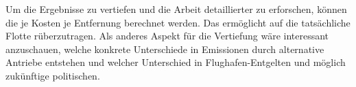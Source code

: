 

Um die Ergebnisse zu vertiefen und die Arbeit detaillierter zu erforschen, können die je Kosten je Entfernung berechnet werden.
Das ermöglicht auf die tatsächliche Flotte rüberzutragen.
Als anderes Aspekt für die Vertiefung wäre interessant anzuschauen, welche konkrete Unterschiede in Emissionen durch alternative Antriebe entstehen
und welcher Unterschied in Flughafen-Entgelten und möglich zukünftige politischen.